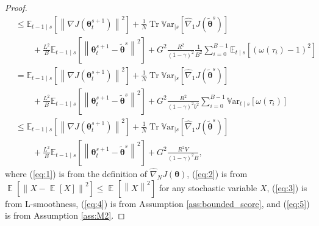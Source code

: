 \documentclass{article}
\theoremstyle{remark}
\theoremstyle{definition}
\DeclareMathOperator*{\EV}{\mathbb{E}}
\DeclareMathOperator{\Tr}{Tr}
\newcommand{\EVV}[2][\ppvect \in \ppspace]{\EV_{#1}\left[{#2}\right]}
\newcommand{\norm}[2][\infty]{\left\|#2\right\|_{#1}}
\newcommand{\vtheta}{\boldsymbol{\theta}}
\newcommand{\gradJ}[1]{\nabla J(#1)}
\newcommand{\gradApp}[2]{\widehat{\nabla}_{#2}J(#1)}
\newcommand{\Ets}[2][t]{\mathbb{E}_{#1\mid s}\left[#2\right]}
\newcommand{\Varts}[2][t]{{\mathbb{V}\text{ar}}_{#1\mid s}\left[#2\right]}
\newcommand{\VARRF}{V}
\newcommand{\GRADLOG}{G}
\begin{document}
\begin{proof}
\begin{align}
	&\leq \Ets[t-1]{\norm[]{\gradJ{\vtheta_t^{s+1}}}^2} 
	+\frac{1}{N}\Tr\Varts[]{\gradApp{\tilde{\vtheta}^s}{1}}
	\nonumber\\
	&\qquad+\frac{L^2}{B}\Ets[t-1]{\norm[]{\vtheta_t^{s+1}-\tilde{\vtheta}^s}^2}
	+\GRADLOG^2\frac{R^2}{(1-\gamma)^2}\frac{1}{B^2}\sum_{i=0}^{B-1}\Ets{(\omega(\tau_i)-1)^2} \label{eq:4}\\
	&= \Ets[t-1]{\norm[]{\gradJ{\vtheta_t^{s+1}}}^2} 
	+\frac{1}{N}\Tr\Varts[]{\gradApp{\tilde{\vtheta}^s}{1}}
	\nonumber\\
	&\qquad+\frac{L^2}{B}\Ets[t-1]{\norm[]{\vtheta_t^{s+1}-\tilde{\vtheta}^s}^2}
	+\GRADLOG^2\frac{R^2}{(1-\gamma)^2b^2}\sum_{i=0}^{B-1}\Varts{\omega(\tau_i)} \nonumber\\
	&\leq \Ets[t-1]{\norm[]{\gradJ{\vtheta_t^{s+1}}}^2} 
	+\frac{1}{N}\Tr\Varts[]{\gradApp{\tilde{\vtheta}^s}{1}}
	\nonumber\\
	&\qquad+\frac{L^2}{B}\Ets[t-1]{\norm[]{\vtheta_t^{s+1}-\tilde{\vtheta}^s}^2}
	+\GRADLOG^2\frac{R^2\VARRF}{(1-\gamma)^2B}, \label{eq:5}
\end{align}
where (\ref{eq:1}) is from the definition of $\gradApp{\vtheta}{N}$, (\ref{eq:2}) is from $\EVV[]{\norm[]{X-\EVV[]{X}}^2}\leq\EVV[]{\norm[]{X}^2}$ for any stochastic variable $X$, (\ref{eq:3}) is from L-smoothness, 
(\ref{eq:4}) is from Assumption \ref{ass:bounded_score}, and (\ref{eq:5}) is from Assumption \ref{ass:M2}.
\end{proof}
\end{document}
